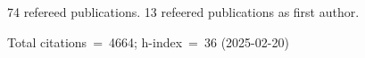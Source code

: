 74 refereed publications. 13 refeered publications as first author.

Total citations~=~4664; h-index~=~36 (2025-02-20)